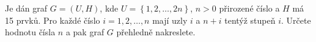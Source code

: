 Je dán graf $G=(U,H)$, kde $U=\left \{ 1,2, \dots,2n \right \}$, $n>0$ přirozené
číslo a $H$ má 15 prvků. Pro každé číslo $i=1,2, \dots,n$ mají uzly $i$ a $n+i$
tentýž stupeň $i$. Určete hodnotu čísla $n$ a pak graf $G$ přehledně nakreslete.
